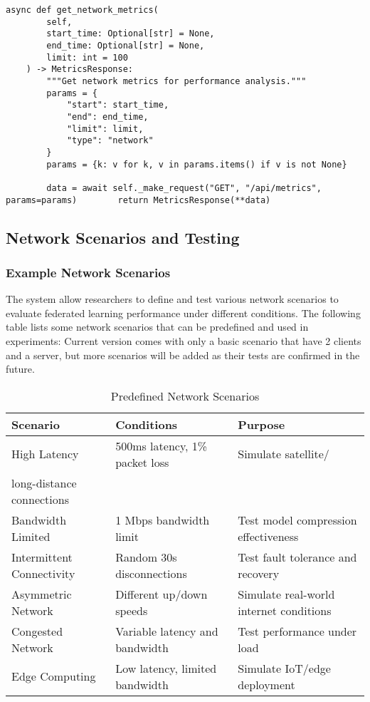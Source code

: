 \begin{lstlisting}[style=pythoncode, caption=Network Performance Analysis]
    async def get_network_metrics(
        self,
        start_time: Optional[str] = None,
        end_time: Optional[str] = None,
        limit: int = 100
    ) -> MetricsResponse:
        """Get network metrics for performance analysis."""
        params = {
            "start": start_time,
            "end": end_time,
            "limit": limit,
            "type": "network"
        }
        params = {k: v for k, v in params.items() if v is not None}
        
        data = await self._make_request("GET", "/api/metrics", params=params)        return MetricsResponse(**data)
\end{lstlisting}

\subsection{Network Scenarios and Testing}

\subsubsection{Example Network Scenarios}

The system allow researchers to define and test various network scenarios to evaluate federated learning performance under different conditions. The following table lists some network scenarios that can be predefined and used in experiments:
Current version comes with only a basic scenario that have 2 clients and a server, but more scenarios will be added as their tests are confirmed in the future.
\begin{table}[H]
\centering
\caption{Predefined Network Scenarios}  
\label{tab:network-scenarios}
\begin{tabular}{@{}llp{6cm}@{}}
\toprule
\textbf{Scenario} & \textbf{Conditions} & \textbf{Purpose} \\
\midrule
High Latency & 500ms latency, 1\% packet loss & Simulate satellite/\\long-distance connections \\
Bandwidth Limited & 1 Mbps bandwidth limit & Test model compression effectiveness \\
Intermittent Connectivity & Random 30s disconnections & Test fault tolerance and recovery \\
Asymmetric Network & Different up/down speeds & Simulate real-world internet conditions \\
Congested Network & Variable latency and bandwidth & Test performance under load \\
Edge Computing & Low latency, limited bandwidth & Simulate IoT/edge deployment \\
\bottomrule
\end{tabular}
\end{table}

